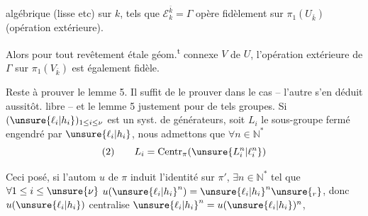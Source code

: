 
 algébrique (lisse etc) sur $k$, tels que $\mathcal E_k^{\bar k}=\Gamma$ opère fidèlement sur $\pi_1(U_{\bar k})$ (opération extérieure).

Alors pour tout revêtement étale géom.\textsuperscript{t} connexe $V$ de $U$, l'opération extérieure de \deleted{\unsure{$\pi$}} $\Gamma$ sur $\pi_1(V_{\bar k})$ est également fidèle.

Reste à prouver le lemme 5. Il suffit de le prouver dans le cas  -- l'autre s'en déduit aussitôt.    libre -- et le lemme 5  justement pour de tels groupes. Si $(\unsure{\ell_i|h_i})_{1\le i\le\nu}$ est un syst. de générateurs, soit $L_i$ le sous-groupe fermé engendré par $\unsure{\ell_i|h_i}$, nous admettons que $\forall n\in\mathbb N^*$
\[
(2)\qquad L_i=\operatorname{Centr}_{\pi}(\unsure{L_i^n|\ell_i^n})
\]

Ceci posé, si l'autom $u$ de $\pi$ induit l'identité sur $\pi'$, $\exists n\in\mathbb N^*$ tel que $\forall 1\le i\le\unsure{\nu}$
$u(\unsure{\ell_i|h_i}^{n})=\unsure{\ell_i|h_i}^{n}\unsure{{}_r}$, donc $u(\unsure{\ell_i|h_i})$ centralise $\unsure{\ell_i|h_i}^{n}=u(\unsure{\ell_i|h_i})^{n}$,

